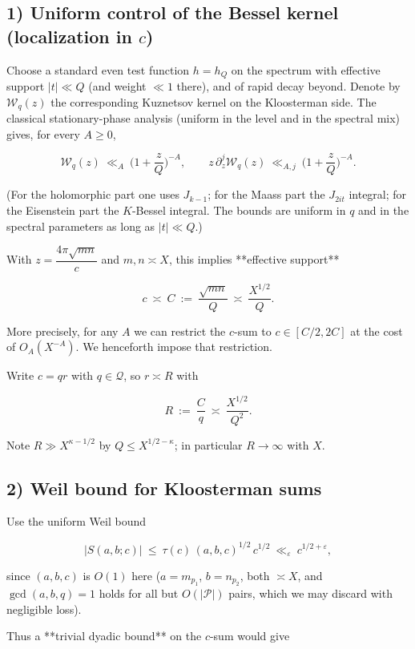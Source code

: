 \documentclass[11pt]{article}
\theoremstyle{definition}
\theoremstyle{remark}
\begin{document}
\subsection*{1) Uniform control of the Bessel kernel (localization in $c$)}

Choose a standard even test function $h=h_Q$ on the spectrum with effective support $|t|\ll Q$ (and weight $\ll 1$ there), and of rapid decay beyond. Denote by $\mathcal W_q(z)$ the corresponding Kuznetsov kernel on the Kloosterman side. The classical stationary-phase analysis (uniform in the level and in the spectral mix) gives, for every $A\ge 0$,

$$
\mathcal W_q(z)\ \ll_A\ \Big(1+\frac{z}{Q}\Big)^{-A},\qquad
z\,\partial_z^j\mathcal W_q(z)\ \ll_{A,j}\ \Big(1+\frac{z}{Q}\Big)^{-A}.
$$

(For the holomorphic part one uses $J_{k-1}$; for the Maass part the $J_{2it}$ integral; for the Eisenstein part the $K$-Bessel integral. The bounds are uniform in $q$ and in the spectral parameters as long as $|t|\ll Q$.)

With $z=\dfrac{4\pi\sqrt{m n}}{c}$ and $m,n\asymp X$, this implies **effective support**

$$
c\ \asymp\ C\ :=\ \frac{\sqrt{mn}}{Q}\ \asymp\ \frac{X^{1/2}}{Q}.
$$

More precisely, for any $A$ we can restrict the $c$-sum to $c\in[C/2,2C]$ at the cost of $O_A(X^{-A})$. We henceforth impose that restriction.

Write $c=qr$ with $q\in\mathcal Q$, so $r\asymp R$ with

$$
R\ :=\ \frac{C}{q}\ \asymp\ \frac{X^{1/2}}{Q^2}.
$$

Note $R\gg X^{\kappa-1/2}$ by $Q\le X^{1/2-\kappa}$; in particular $R\to\infty$ with $X$.

\subsection*{2) Weil bound for Kloosterman sums}

Use the uniform Weil bound

$$
|S(a,b;c)|\ \le\ \tau(c)\,(a,b,c)^{1/2}\,c^{1/2}\ \ll_\varepsilon\ c^{1/2+\varepsilon},
$$

since $(a,b,c)$ is $O(1)$ here ($a=m_{p_1}$, $b=n_{p_2}$, both $\asymp X$, and $\gcd(a,b,q)=1$ holds for all but $O(|\mathcal P|)$ pairs, which we may discard with negligible loss).

Thus a **trivial dyadic bound** on the $c$-sum would give
\end{document}
